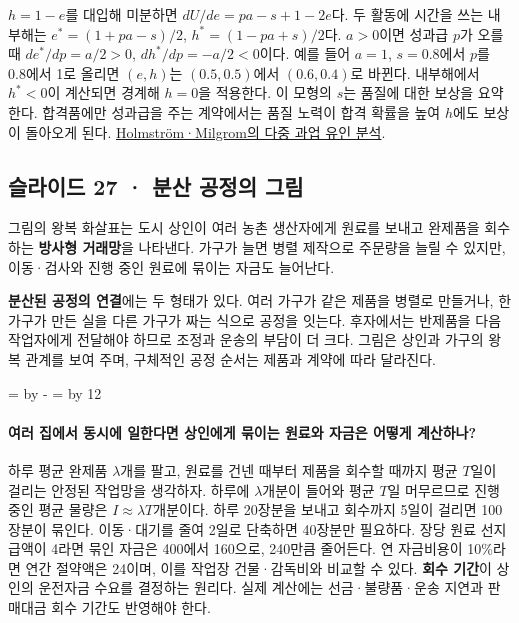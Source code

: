\documentclass[10pt,a4paper]{article}
\newcommand{\ReserveQuestionSpace}{%
  \par\begingroup
  \dimen0=\pagegoal \advance\dimen0 by -\pagetotal
  \dimen2=\baselineskip \multiply\dimen2 by 12
  \ifdim\dimen0<\dimen2 \newpage\fi
  \endgroup}
\begin{document}
$h=1-e$를 대입해 미분하면 $dU/de=pa-s+1-2e$다. 두 활동에 시간을 쓰는 내부해는 $e^*=(1+pa-s)/2$, $h^*=(1-pa+s)/2$다. $a>0$이면 성과급 $p$가 오를 때 $de^*/dp=a/2>0$, $dh^*/dp=-a/2<0$이다. 예를 들어 $a=1$, $s=0.8$에서 $p$를 0.8에서 1로 올리면 $(e,h)$는 $(0.5,0.5)$에서 $(0.6,0.4)$로 바뀐다. 내부해에서 $h^*<0$이 계산되면 경계해 $h=0$을 적용한다. 이 모형의 $s$는 품질에 대한 보상을 요약한다. 합격품에만 성과급을 주는 계약에서는 품질 노력이 합격 확률을 높여 $h$에도 보상이 돌아오게 된다. \href{https://web.stanford.edu/\%7Emilgrom/publishedarticles/Multitask\%20Principal\%20Agent.pdf}{Holmström·Milgrom의 다중 과업 유인 분석}.\par

\subsection{슬라이드 27 · 분산 공정의 그림}
그림의 왕복 화살표는 도시 상인이 여러 농촌 생산자에게 원료를 보내고 완제품을 회수하는 \textbf{방사형 거래망}을 나타낸다. 가구가 늘면 병렬 제작으로 주문량을 늘릴 수 있지만, 이동·검사와 진행 중인 원료에 묶이는 자금도 늘어난다.\par

\textbf{분산된 공정의 연결}에는 두 형태가 있다. 여러 가구가 같은 제품을 병렬로 만들거나, 한 가구가 만든 실을 다른 가구가 짜는 식으로 공정을 잇는다. 후자에서는 반제품을 다음 작업자에게 전달해야 하므로 조정과 운송의 부담이 더 크다. 그림은 상인과 가구의 왕복 관계를 보여 주며, 구체적인 공정 순서는 제품과 계약에 따라 달라진다.\par

\ReserveQuestionSpace
\paragraph{여러 집에서 동시에 일한다면 상인에게 묶이는 원료와 자금은 어떻게 계산하나?}
하루 평균 완제품 $\lambda$개를 팔고, 원료를 건넨 때부터 제품을 회수할 때까지 평균 $T$일이 걸리는 안정된 작업망을 생각하자. 하루에 $\lambda$개분이 들어와 평균 $T$일 머무르므로 진행 중인 평균 물량은 $I\approx\lambda T$개분이다. 하루 20장분을 보내고 회수까지 5일이 걸리면 100장분이 묶인다. 이동·대기를 줄여 2일로 단축하면 40장분만 필요하다. 장당 원료 선지급액이 4라면 묶인 자금은 400에서 160으로, 240만큼 줄어든다. 연 자금비용이 10\%라면 연간 절약액은 24이며, 이를 작업장 건물·감독비와 비교할 수 있다. \textbf{회수 기간}이 상인의 운전자금 수요를 결정하는 원리다. 실제 계산에는 선금·불량품·운송 지연과 판매대금 회수 기간도 반영해야 한다.\par
\end{document}
